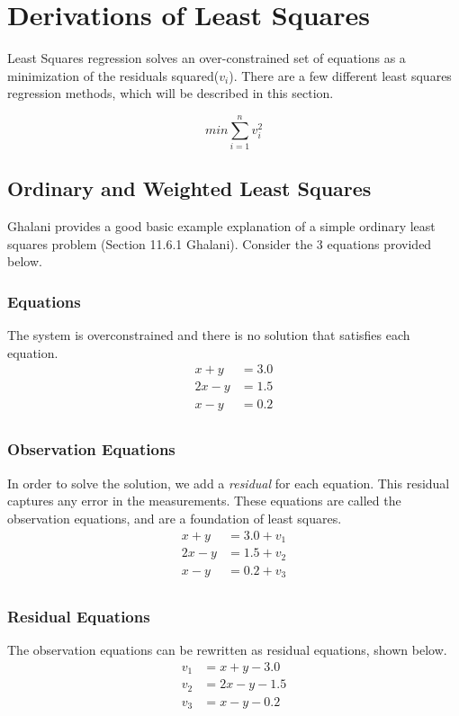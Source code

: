 \section{Derivations of Least Squares}
Least Squares regression solves an over-constrained set of equations as a minimization of the residuals squared($v_i$).  There are a few different least squares regression methods, which will be described in this section.

\[
min \sum_{i=1}^{n} v_i^2
\]

\subsection{Ordinary and Weighted Least Squares}
Ghalani provides a good basic example explanation of a simple ordinary least squares problem (Section 11.6.1 Ghalani). Consider the 3 equations provided below.  

\subsubsection*{Equations}
The system is overconstrained and there is no solution that satisfies each equation.
\begin{align*}
x+y &= 3.0 \\
2x-y &= 1.5 \\
x-y &= 0.2 \\
\end{align*}

\subsubsection*{Observation Equations}
In order to solve the solution, we add a \textit{residual} for each equation.  This residual captures any error in the measurements.  These equations are called the observation equations, and are a foundation of least squares.
\begin{align*}
x+y &= 3.0 + v_1\\
2x-y &= 1.5 + v_2\\
x-y &= 0.2 + v_3\\
\end{align*}

\subsubsection*{Residual Equations}
The observation equations can be rewritten as residual equations, shown below.	
\begin{align*}
v_1 &= x + y - 3.0 \\
v_2 &= 2x - y - 1.5 \\
v_3 &= x - y - 0.2 \\
\end{align*}

